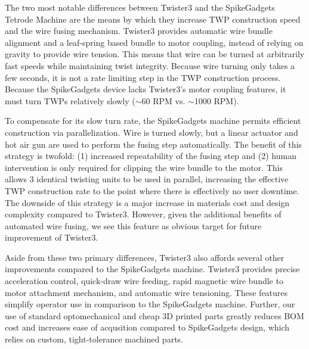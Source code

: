\documentclass[11pt,a4paper]{article}
\begin{document}
The two most notable differences between Twister3 and the SpikeGadgets Tetrode
Machine are the means by which they increase TWP construction speed and the
wire fusing mechanism. Twister3 provides automatic wire bundle alignment and a
leaf-spring based bundle to motor coupling, instead of relying on gravity to
provide wire tension. This means that wire can be turned at arbitrarily fast
speeds while maintaining twist integrity. Because wire turning only takes a few
seconds, it is not a rate limiting step in the TWP construction process.
Because the SpikeGadgets device lacks Twister3's motor coupling features, it
must turn TWPs relatively slowly ($\sim$60 RPM vs. $\sim$1000 RPM).

To compensate for its slow turn rate, the SpikeGadgets machine permits
efficient construction via parallelization. Wire is turned slowly, but a linear
actuator and hot air gun are used to perform the fusing step automatically. The
benefit of this strategy is twofold: (1) increased repeatability of the fusing
step and (2) human intervention is only required for clipping the wire bundle
to the motor. This allows 3 identical twisting units to be used in parallel,
increasing the effective TWP construction rate to the point where there is
effectively no user downtime. The downside of this strategy is a major increase
in materials cost and design complexity compared to Twister3. However, given
the additional benefits of automated wire fusing, we see this feature as
obvious target for future improvement of Twister3.

Aside from these two primary differences, Twister3 also affords several other
improvements compared to the SpikeGadgets machine. Twister3 provides precise
acceleration control, quick-draw wire feeding, rapid magnetic wire bundle to
motor attachment mechanism, and automatic wire tensioning. These features
simplify operator use in comparison to the SpikeGadgets machine. Further, our
use of standard optomechanical and cheap 3D printed parts greatly reduces BOM
cost and increases ease of acqusition compared to SpikeGadgets design, which
relies on custom, tight-tolerance machined parts.
\end{document}
